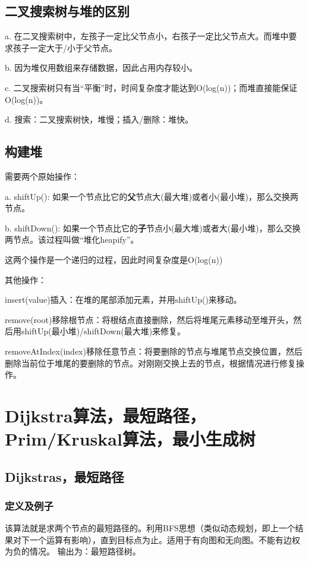 \documentclass[a4paper]{article}    %
\begin{document}
\subsection{二叉搜索树与堆的区别}

a. 在二叉搜索树中，左孩子一定比父节点小，右孩子一定比父节点大。而堆中要求孩子一定大于/小于父节点。

b. 因为堆仅用数组来存储数据，因此占用内存较小。

c. 二叉搜索树只有当“平衡”时，时间复杂度才能达到O(log(n))；而堆直接能保证O(log(n))。

d. 搜索：二叉搜索树快，堆慢；插入/删除：堆快。


\subsection{构建堆}

\noindent 需要两个原始操作：

a. shiftUp(): 如果一个节点比它的\textbf{父}节点大(最大堆)或者小(最小堆)，那么交换两节点。

b. shiftDown(): 如果一个节点比它的\textbf{子}节点小(最大堆)或者大(最小堆)，那么交换两节点。该过程叫做“堆化heapify”。

\noindent 这两个操作是一个递归的过程，因此时间复杂度是O(log(n))

\noindent 其他操作：

insert(value)插入：在堆的尾部添加元素，并用shiftUp()来移动。

remove(root)移除根节点：将根结点直接删除，然后将堆尾元素移动至堆开头，然后用shiftUp(最小堆)/shiftDown(最大堆)来修复。

removeAtIndex(index)移除任意节点：将要删除的节点与堆尾节点交换位置，然后删除当前位于堆尾的要删除的节点。对刚刚交换上去的节点，根据情况进行修复操作。

\section{Dijkstra算法，最短路径，Prim/Kruskal算法，最小生成树}

\subsection{Dijkstras，最短路径}

\subsubsection{定义及例子} 该算法就是求两个节点的最短路径的。利用BFS思想（类似动态规划，即上一个结果对下一个运算有影响），直到目标点为止。适用于有向图和无向图。不能有边权为负的情况。
输出为：最短路径树。
\end{document}
